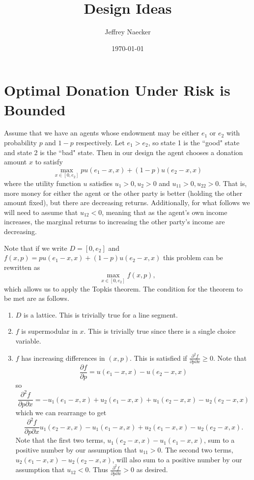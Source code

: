 \documentclass[11pt]{article}
\title{Design Ideas}
\author{Jeffrey Naecker}
\date{\today}
\begin{document}
\maketitle

\section{Optimal Donation Under Risk is Bounded}

Assume that we have an agents whose endowment may be either $e_1$ or $e_2$ with probability $p$ and $1-p$ respectively.  Let $e_1 > e_2$, so state 1 is the ``good" state and state 2 is the ``bad" state.  Then in our design the agent chooses a donation amount $x$ to satisfy
\[
\max_{x \in [0, e_2]} p u(e_1 - x, x) + (1-p) u(e_2 - x, x)
\]
where the utility function $u$ satisfies $u_1>0, u_2>0$ and $u_{11}>0, u_{22}>0$.  That is, more money for either the agent or the other party is better (holding the other amount fixed), but there are decreasing returns.  Additionally, for what follows we will need to assume that $u_{12} < 0$, meaning that as the agent's own income increases, the marginal returns to increasing the other party's income are decreasing.

Note that if we write $D =  [0, e_2]$ and $f(x, p) = p u(e_1 - x, x) + (1-p) u(e_2 - x, x)$ this problem can be rewritten as
\[
\max_{x \in [0, e_2]} f(x, p),
\]
which allows us to apply the Topkis theorem.  The condition for the theorem to be met are as follows.

\begin{enumerate}

\item $D$ is a lattice.  This is trivially true for a line segment.

\item $f$ is supermodular in $x$.  This is trivially true since there is a single choice variable.

\item $f$ has increasing differences in $(x, p)$.  This is satisfied if $\frac{\partial^2 f}{\partial p \partial x} \geq 0$.  Note that 
\[
\frac{\partial f}{\partial p} = u(e_1 - x, x) - u(e_2 - x, x) 
\]
so 
\[
\frac{\partial^2 f}{\partial p \partial x} = -u_1(e_1 - x, x) + u_2(e_1 - x, x) + u_1(e_2 - x, x) - u_2(e_2 - x, x) 
\]
which we can rearrange to get
\[
\frac{\partial^2 f}{\partial p \partial x}   u_1(e_2 - x, x) -u_1(e_1 - x, x) + u_2(e_1 - x, x) - u_2(e_2 - x, x)  .
\]
Note that the first two terms, $u_1(e_2 - x, x) -u_1(e_1 - x, x)$, sum to a positive number by our assumption that $u_{11} > 0$.  The second two terms, $u_2(e_1 - x, x) - u_2(e_2 - x, x)$, will also sum to a positive number by our assumption that $u_{12} < 0$.  Thus $\frac{\partial^2 f}{\partial p \partial x} > 0$ as desired.
\end{enumerate}
\end{document}
